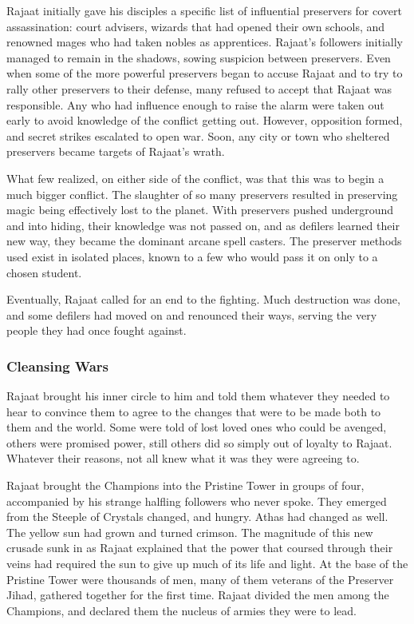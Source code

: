 Rajaat initially gave his disciples a specific list of influential preservers for covert assassination: court advisers, wizards that had opened their own schools, and renowned mages who had taken nobles as apprentices. Rajaat's followers initially managed to remain in the shadows, sowing suspicion between preservers. Even when some of the more powerful preservers began to accuse Rajaat and to try to rally other preservers to their defense, many refused to accept that Rajaat was responsible. Any who had influence enough to raise the alarm were taken out early to avoid knowledge of the conflict getting out. However, opposition formed, and secret strikes escalated to open war. Soon, any city or town who sheltered preservers became targets of Rajaat's wrath.

What few realized, on either side of the conflict, was that this was to begin a much bigger conflict. The slaughter of so many preservers resulted in preserving magic being effectively lost to the planet. With preservers pushed underground and into hiding, their knowledge was not passed on, and as defilers learned their new way, they became the dominant arcane spell casters. The preserver methods used exist in isolated places, known to a few who would pass it on only to a chosen student.

Eventually, Rajaat called for an end to the fighting. Much destruction was done, and some defilers had moved on and renounced their ways, serving the very people they had once fought against.

\subsubsection{Cleansing Wars}
Rajaat brought his inner circle to him and told them whatever they needed to hear to convince them to agree to the changes that were to be made both to them and the world. Some were told of lost loved ones who could be avenged, others were promised power, still others did so simply out of loyalty to Rajaat. Whatever their reasons, not all knew what it was they were agreeing to.

Rajaat brought the Champions into the Pristine Tower in groups of four, accompanied by his strange halfling followers who never spoke. They emerged from the Steeple of Crystals changed, and hungry. Athas had changed as well. The yellow sun had grown and turned crimson. The magnitude of this new crusade sunk in as Rajaat explained that the power that coursed through their veins had required the sun to give up much of its life and light. At the base of the Pristine Tower were thousands of men, many of them veterans of the Preserver Jihad, gathered together for the first time. Rajaat divided the men among the Champions, and declared them the nucleus of armies they were to lead.

